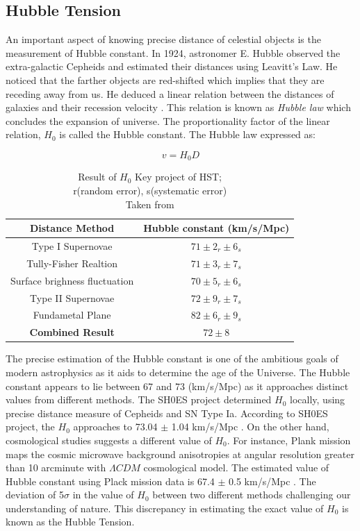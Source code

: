  \vspace{0.1cm}
\subsection{Hubble Tension}
An important aspect of knowing precise distance of celestial objects is the measurement of Hubble constant. In 1924, astronomer E. Hubble observed the extra-galactic Cepheids and estimated their distances using Leavitt's Law. He noticed that the farther objects are red-shifted which implies that they are receding away from us. He deduced a linear relation between the distances of galaxies and their recession velocity \cite{hubble1929relation}. This relation is known as \textit{Hubble law} which concludes the expansion of universe. The proportionality factor of the linear relation, $H_0$ is called the Hubble constant. The Hubble law expressed as:

\begin{equation}
	v = H_0 D
\end{equation}
 
 
 \begin{table}[h!]
 	\centering
 	\caption{Result of $H_0$ Key project of HST; \\ r(random error), s(systematic error) \\ Taken from \cite{freedman2001final} }
 	\begin{tabular}{c|c}
 		\textbf{Distance Method} & \textbf{Hubble constant (km/s/Mpc)} \\ \hline
 		Type I Supernovae & $71 \pm 2_r \pm 6_s$ \\
 		Tully-Fisher Realtion & $71 \pm 3_r \pm 7_s$ \\
 		Surface brighness fluctuation & $70 \pm 5_r \pm 6_s$ \\
 		Type II Supernovae & $72 \pm 9_r \pm 7_s$ \\
 		Fundametal Plane & $82 \pm 6_r \pm 9_s$ \\ \hline
 		\textbf{Combined Result} & $72 \pm 8 $
 	\end{tabular}
 \end{table} 
 
\noindent The precise estimation of the Hubble constant is one of the ambitious goals of modern astrophysics as it aids to determine the age of the Universe. The Hubble constant appears to lie between 67 and 73 (km/s/Mpc) as it approaches distinct values from different methods. The SH0ES project determined $H_0$ locally, using precise distance measure of Cepheids and SN Type Ia. According to SH0ES project, the $H_0$ approaches to 73.04 $\pm$ 1.04 km/s/Mpc \cite{riess2022comprehensive}. On the other hand, cosmological studies suggests a different value of $H_0$. For instance, Plank mission maps the cosmic microwave background anisotropies at angular resolution greater than 10 arcminute with $\Lambda CDM$ cosmological model. The estimated value of Hubble constant using Plack mission data is 67.4 $\pm$ 0.5 km/s/Mpc \citep{2020planck}. The deviation of 5$\sigma$ in the value of $H_0$ between two different methods challenging our understanding of nature. This discrepancy in estimating the exact value of $H_0$ is known as the Hubble Tension. 


